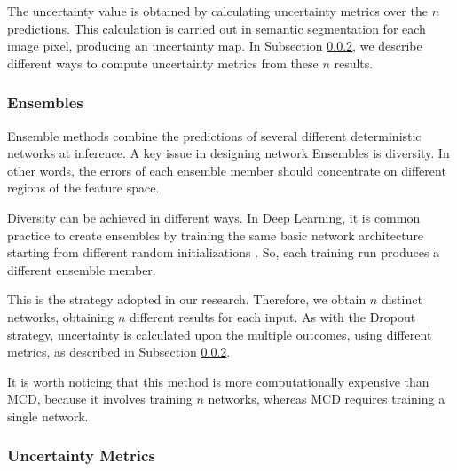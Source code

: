 The uncertainty value is obtained by calculating uncertainty metrics over the $n$ predictions. This calculation is carried out in semantic segmentation for each image pixel, producing an uncertainty map. In Subsection \ref{ref:metrics}, we describe different ways to compute uncertainty metrics from these $n$ results.


\bigskip
\noindent
\subsubsection{Ensembles}

Ensemble methods combine the predictions of several different deterministic networks at inference. A key issue in designing network Ensembles  is diversity. In other words,  the errors of each ensemble member should concentrate on different regions of the feature space.

Diversity can be achieved in different ways. In Deep Learning, it is common practice to create ensembles by training the same basic network architecture starting from different random initializations \cite{lakshminarayanan2017simple}. So, each training run produces a different ensemble member. 

This is the strategy adopted in our research. Therefore, we obtain $n$ distinct networks, obtaining $n$ different results for each input. 
 As with the Dropout strategy, uncertainty is calculated upon the multiple outcomes, using different metrics, as described in Subsection \ref{ref:metrics}.


It is worth noticing that this method is more computationally expensive than MCD, because it involves training $n$ networks, whereas MCD requires training a single network. %



\subsubsection{Uncertainty Metrics}
\label{ref:metrics}


